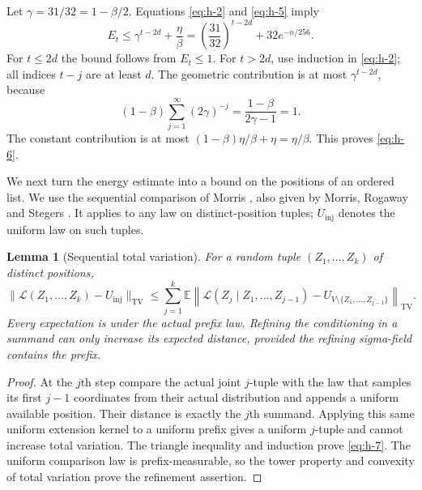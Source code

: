 \documentclass[11pt]{article}
\newtheorem{lemma}[theorem]{Lemma}
\theoremstyle{remark}
\numberwithin{equation}{section}
\begin{document}
Let \(\gamma=31/32=1-\beta/2\). Equations \eqref{eq:h-2} and \eqref{eq:h-5} imply
\begin{equation}\label{eq:h-6}
 E_t\le\gamma^{t-2d}+\frac\eta\beta
       =\left(\frac{31}{32}\right)^{t-2d}
          +32e^{-n/256}.
\end{equation}
For \(t\le2d\) the bound follows from \(E_t\le1\). For \(t>2d\), use induction in \eqref{eq:h-2}; all indices \(t-j\) are at least \(d\). The geometric contribution is at most \(\gamma^{t-2d}\), because
\[
 (1-\beta)\sum_{j=1}^{\infty}(2\gamma)^{-j}
 =\frac{1-\beta}{2\gamma-1}=1.
\]
The constant contribution is at most
\((1-\beta)\eta/\beta+\eta=\eta/\beta\).
This proves \eqref{eq:h-6}.

We next turn the energy estimate into a bound on the positions of an ordered list. We use the sequential comparison of Morris \cite[Section~5.3, Lemma~12]{morris-exclusion}, also given by Morris, Rogaway and Stegers \cite[Appendix~A, Lemma~2]{mrs}. It applies to any law on distinct-position tuples; $U_{\mathrm{inj}}$ denotes the uniform law on such tuples.
\begin{lemma}[Sequential total variation]\label{lem:sequential-tv}
For a random tuple $(Z_1,\ldots,Z_k)$ of distinct positions,
\begin{equation}\label{eq:h-7}
 \|\mathcal L(Z_1,\ldots,Z_k)-U_{\mathrm{inj}}\|_{\mathrm{TV}}
 \le\sum_{j=1}^k
  \mathbb E\left\|\mathcal L(Z_j\mid Z_1,\ldots,Z_{j-1})
       -U_{V\setminus\{Z_1,\ldots,Z_{j-1}\}}\right\|_{\mathrm{TV}}.
\end{equation}
Every expectation is under the actual prefix law. Refining the conditioning in a summand can only increase its expected distance, provided the refining sigma-field contains the prefix.
\end{lemma}
\begin{proof}
At the $j$th step compare the actual joint $j$-tuple with the law that
samples its first $j-1$ coordinates from their actual distribution and
appends a uniform available position. Their distance is exactly the
$j$th summand. Applying this same uniform extension kernel to a uniform
prefix gives a uniform $j$-tuple and cannot increase total variation.
The triangle inequality and induction prove \eqref{eq:h-7}. The uniform comparison law is prefix-measurable, so the tower property and convexity of total variation prove the refinement assertion.
\end{proof}
\end{document}

